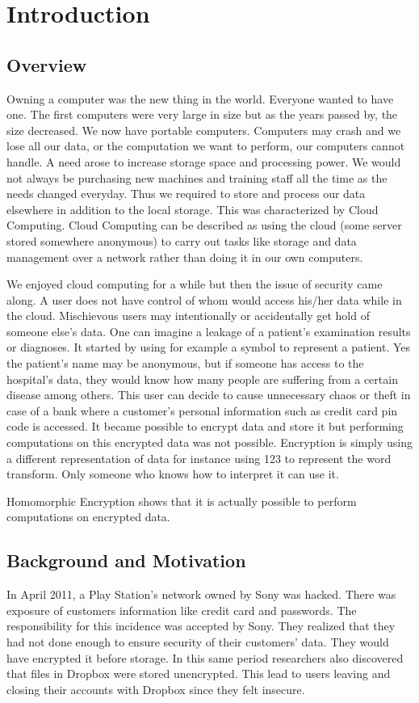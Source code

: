 \chapter{Introduction}
\section{Overview}
Owning a computer was the new thing in the world. Everyone wanted to have one. The first computers were very large in size but as the years passed by, the size decreased. We now have portable computers. Computers may crash and we lose all our data, or the computation we want to perform, our computers cannot handle. A need arose to increase storage space and processing power. We would not always be purchasing new machines and training staff all the time as the needs changed everyday.  Thus we required to store and process our data elsewhere in addition to the local storage. This was characterized by Cloud Computing. Cloud Computing can be described as using the cloud (some server stored somewhere anonymous) to carry out tasks like storage and data management over a network rather than doing it in our own computers.  

We enjoyed cloud computing for a while but then the issue of security came along. A user does not have control of whom would access his/her data while in the cloud. Mischievous users may intentionally or accidentally get hold of someone else's data. One can imagine a leakage of a patient's examination results or diagnoses. It started by using for example a symbol to represent a patient. Yes the patient's name may be anonymous, but if someone has access to the hospital's data, they would know how many people are suffering from a certain disease among others. This user can decide to cause unnecessary chaos or theft in case of a bank where a customer's personal information such as credit card pin code is accessed. It became possible to encrypt data and store it but performing computations on this encrypted data was not possible. Encryption is simply using a different representation of data for instance using 123 to represent the word transform. Only someone who knows how to interpret it can use it.
 
Homomorphic Encryption shows that it is actually possible to perform computations on encrypted data.

\section{Background and Motivation} 
In April 2011, a Play Station's network owned by Sony was hacked. There was exposure of customers information like credit card and passwords. The responsibility for this incidence was accepted by Sony. They realized that they had not done enough to ensure security of their customers' data. They would have encrypted it before storage. In this same period researchers also discovered that files in Dropbox were stored unencrypted. This lead to users leaving and closing their accounts with Dropbox since they felt insecure.  

